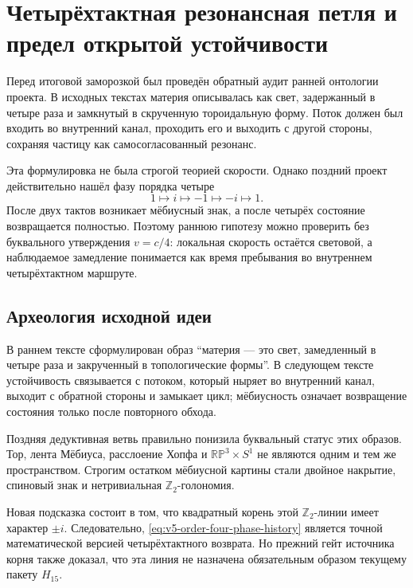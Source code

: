 \chapter{Четырёхтактная резонансная петля и предел открытой устойчивости}

Перед итоговой заморозкой был проведён обратный аудит ранней онтологии
проекта. В исходных текстах материя описывалась как свет, задержанный в
четыре раза и замкнутый в скрученную тороидальную форму. Поток должен был
входить во внутренний канал, проходить его и выходить с другой стороны,
сохраняя частицу как самосогласованный резонанс.

Эта формулировка не была строгой теорией скорости. Однако поздний проект
действительно нашёл фазу порядка четыре
\begin{equation}
 1\longmapsto i\longmapsto-1\longmapsto-i\longmapsto1.
 \label{eq:v5-order-four-phase-history}
\end{equation}
После двух тактов возникает мёбиусный знак, а после четырёх состояние
возвращается полностью. Поэтому раннюю гипотезу можно проверить без
буквального утверждения $v=c/4$: локальная скорость остаётся световой, а
наблюдаемое замедление понимается как время пребывания во внутреннем
четырёхтактном маршруте.

\section{Археология исходной идеи}

В раннем тексте 
сформулирован образ ``материя --- это свет, замедленный в четыре раза и
закрученный в топологические формы''. В следующем тексте
 устойчивость связывается
с потоком, который ныряет во внутренний канал, выходит с обратной стороны
и замыкает цикл; мёбиусность означает возвращение состояния только после
повторного обхода.

Поздняя дедуктивная ветвь правильно понизила буквальный статус этих
образов. Тор, лента Мёбиуса, расслоение Хопфа и
$\mathbb{RP}^3\times S^1$ не являются одним и тем же пространством.
Строгим остатком мёбиусной картины стали двойное накрытие, спиновый знак и
нетривиальная $\mathbb Z_2$-голономия.

Новая подсказка состоит в том, что квадратный корень этой
$\mathbb Z_2$-линии имеет характер $\pm i$. Следовательно,
\eqref{eq:v5-order-four-phase-history} является точной математической
версией четырёхтактного возврата. Но прежний гейт источника корня также
доказал, что эта линия не назначена обязательным образом текущему пакету
$H_{15}$.

